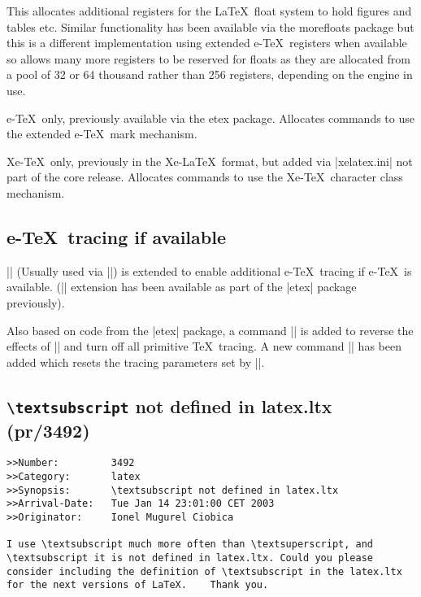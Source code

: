 \documentclass{ltxguide}
\newcommand\Lpack[1]{\mbox{\textsf{#1}}}
\newcommand\DescribeMacro[1]{\texttt{\string#1}}
\begin{document}
\DescribeMacro{\extrafloats}
\smallskip

This allocates additional registers for the \LaTeX\ float system to
hold figures and tables etc. Similar functionality has been
available via the \Lpack{morefloats} package but this is a different
implementation using extended e-\TeX\ registers when available so
allows many more registers to be reserved for floats as they are
allocated from a pool of 32 or 64 thousand rather than 256 registers,
depending on the engine in use.

\DescribeMacro{\newmarks}
\smallskip

e-\TeX\ only, previously available via the \Lpack{etex} package.
Allocates commands to use the extended  e-\TeX\ mark mechanism.

\DescribeMacro{\newXeTeXintercharclass}
\smallskip

Xe-\TeX\ only, previously in the Xe-\LaTeX\ format, but added via
|xelatex.ini| not part of the core release. 
Allocates commands to use the Xe-\TeX\ character class mechanism.


\subsection{e-\TeX\ tracing if available}
|\loggingall| (Usually used via |\tracingall|) is extended to enable
additional e-\TeX\ tracing if e-\TeX\ is available. (|\tracingall|
extension has been available as part of the |etex| package previously).

Also based on code from the |etex| package, a command |\tracingnone|
is added to reverse the effects of |\tracingall| and turn off all primitive
\TeX\ tracing. A new command |\hideoutput| has been  added which resets the
tracing parameters set by |\showoutput|.




\subsection{\texttt{\textbackslash textsubscript} not defined in
   latex.ltx (pr/3492)}

\begin{verbatim}
>>Number:         3492
>>Category:       latex
>>Synopsis:       \textsubscript not defined in latex.ltx
>>Arrival-Date:   Tue Jan 14 23:01:00 CET 2003
>>Originator:     Ionel Mugurel Ciobica

I use \textsubscript much more often than \textsuperscript, and
\textsubscript it is not defined in latex.ltx. Could you please
consider including the definition of \textsubscript in the latex.ltx
for the next versions of LaTeX.    Thank you.
\end{verbatim}
\end{document}
